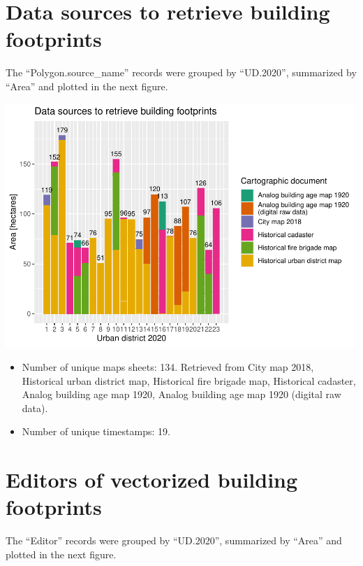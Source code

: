 \documentclass[
]{article}
\providecommand{\tightlist}{%
  \setlength{\itemsep}{0pt}\setlength{\parskip}{0pt}}
\begin{document}
\hypertarget{data-sources-to-retrieve-building-footprints}{%
\section{Data sources to retrieve building
footprints}\label{data-sources-to-retrieve-building-footprints}}

The ``Polygon.source\_name'' records were grouped by ``UD.2020'',
summarized by ``Area'' and plotted in the next figure.

\includegraphics{Usage_code_files/figure-latex/unnamed-chunk-5-1.pdf}

\begin{itemize}
\tightlist
\item
  Number of unique maps sheets: 134. Retrieved from City map 2018,
  Historical urban district map, Historical fire brigade map, Historical
  cadaster, Analog building age map 1920, Analog building age map 1920
  (digital raw data).
\item
  Number of unique timestamps: 19.
\end{itemize}

\hypertarget{editors-of-vectorized-building-footprints}{%
\section{Editors of vectorized building
footprints}\label{editors-of-vectorized-building-footprints}}

The ``Editor'' records were grouped by ``UD.2020'', summarized by
``Area'' and plotted in the next figure.
\end{document}
